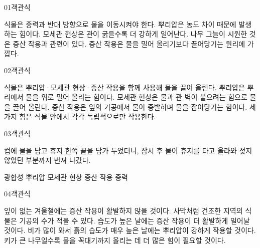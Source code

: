 \documentclass[fs9,seriesRus]{korfarm-base}
\begin{document}
\kfEndMC

\kfActivityBg \par{}\par\nopagebreak[4]\smallskip\nopagebreak[4]
\begin{kfStructure}
\end{kfStructure}


\par\medskip
\kfBeginMC
\begin{kfQBlock}{01}{객관식}
\begin{kfChoices}
\kfChoice 식물은 중력과 반대 방향으로 물을 이동시켜야 한다.
\kfChoice 뿌리압은 농도 차이 때문에 발생하는 힘이다.
\kfChoice 모세관 현상은 관이 굵을수록 더 강하게 일어난다.
\kfChoice 나무 그늘이 시원한 것은 증산 작용과 관련이 있다.
\kfChoice 증산 작용은 물을 밀어 올리기보다 끌어당기는 원리에 가깝다.
\end{kfChoices}
\end{kfQBlock}
\begin{kfQBlock}{02}{객관식}
\begin{kfChoices}
\kfChoice 식물은 뿌리압·모세관 현상·증산 작용을 함께 사용해 물을 끌어 올린다.
\kfChoice 뿌리압은 뿌리에서 물을 위로 밀어 올리는 힘이다.
\kfChoice 모세관 현상은 물과 관 벽이 붙으려는 힘으로 물을 끌어 올린다.
\kfChoice 증산 작용은 잎의 기공에서 물이 증발하며 물을 잡아당기는 힘이다.
\kfChoice 세 가지 힘은 식물 안에서 각각 독립적으로만 작용한다.
\end{kfChoices}
\end{kfQBlock}
\begin{kfQBlock}{03}{객관식}
\begin{kfEvidence}컵에 물을 담고 휴지 한쪽 끝을 담가 두었더니, 잠시 후 물이 휴지를 타고 올라와 젖지 않았던 부분까지 번져 나갔다.\end{kfEvidence}
\begin{kfChoices}
\kfChoice 광합성
\kfChoice 뿌리압
\kfChoice 모세관 현상
\kfChoice 증산 작용
\kfChoice 중력
\end{kfChoices}
\end{kfQBlock}
\begin{kfQBlock}{04}{객관식}
\begin{kfChoices}
\kfChoice 잎이 없는 겨울철에는 증산 작용이 활발하지 않을 것이다.
\kfChoice 사막처럼 건조한 지역의 식물은 기공의 수가 적을 수 있다.
\kfChoice 습도가 높은 날에는 증산 작용이 더 활발하게 일어날 것이다.
\kfChoice 비가 많이 와서 흙의 습도가 매우 높은 날에는 뿌리압이 강하게 작용할 것이다.
\kfChoice 키가 큰 나무일수록 물을 꼭대기까지 올리는 데 더 많은 힘이 필요할 것이다.
\end{kfChoices}
\end{kfQBlock}
\end{document}
